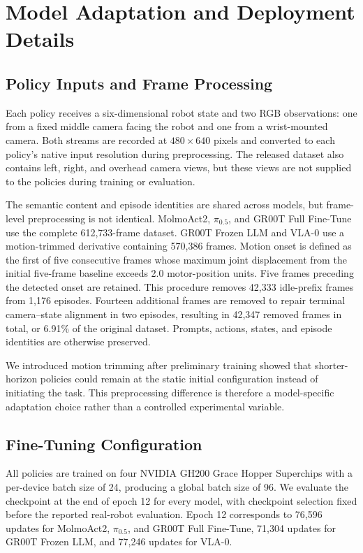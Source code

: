 \documentclass[conference]{IEEEtran}
\begin{document}
\section{Model Adaptation and Deployment Details}
\label{app:model_details}

\subsection{Policy Inputs and Frame Processing}

Each policy receives a six-dimensional robot state and two RGB observations: one from a fixed middle camera facing the robot and one from a wrist-mounted camera. Both streams are recorded at $480\times640$ pixels and converted to each policy's native input resolution during preprocessing. The released dataset also contains left, right, and overhead camera views, but these views are not supplied to the policies during training or evaluation.

The semantic content and episode identities are shared across models, but frame-level preprocessing is not identical. MolmoAct2, $\pi_{0.5}$, and GR00T Full Fine-Tune use the complete 612,733-frame dataset. GR00T Frozen LLM and VLA-0 use a motion-trimmed derivative containing 570,386 frames. Motion onset is defined as the first of five consecutive frames whose maximum joint displacement from the initial five-frame baseline exceeds 2.0 motor-position units. Five frames preceding the detected onset are retained. This procedure removes 42,333 idle-prefix frames from 1,176 episodes. Fourteen additional frames are removed to repair terminal camera--state alignment in two episodes, resulting in 42,347 removed frames in total, or 6.91\% of the original dataset. Prompts, actions, states, and episode identities are otherwise preserved.

We introduced motion trimming after preliminary training showed that shorter-horizon policies could remain at the static initial configuration instead of initiating the task. This preprocessing difference is therefore a model-specific adaptation choice rather than a controlled experimental variable.

\subsection{Fine-Tuning Configuration}

All policies are trained on four NVIDIA GH200 Grace Hopper Superchips with a per-device batch size of 24, producing a global batch size of 96. We evaluate the checkpoint at the end of epoch 12 for every model, with checkpoint selection fixed before the reported real-robot evaluation. Epoch 12 corresponds to 76,596 updates for MolmoAct2, $\pi_{0.5}$, and GR00T Full Fine-Tune, 71,304 updates for GR00T Frozen LLM, and 77,246 updates for VLA-0.
\end{document}
